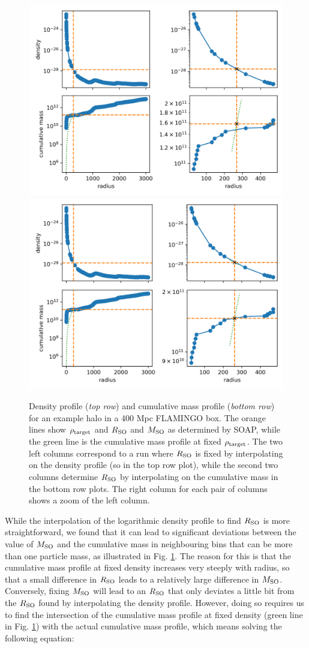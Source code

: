 \documentclass{article}
\begin{document}
\begin{figure}
    \centering
    \includegraphics[width=0.48\textwidth{}]{image7.png}
    \includegraphics[width=0.48\textwidth{}]{image4.png}
    \caption{Density profile (\emph{top row}) and cumulative mass profile (\emph{bottom row}) for an example 
    halo in a 400 Mpc FLAMINGO box. The orange lines show $\rho{}_{\rm{}target}$ and $R_{\rm{}SO}$ and 
    $M_{\rm{}SO}$ as determined by SOAP, while the green line is the cumulative mass profile at fixed 
    $\rho{}_{\rm{}target}$. The two left columns correspond to a run where $R_{\rm{}SO}$ is fixed by 
    interpolating on the density profile (so in the top row plot), while the second two columns determine 
    $R_{\rm{}SO}$ by interpolating on the cumulative mass in the bottom row plots. The right column for each 
    pair of columns shows a zoom of the left column.}
    \label{fig:MSO_vs_RSO}
\end{figure}

While the interpolation of the logarithmic density profile to find $R_{\rm{}SO}$ is more straightforward, we 
found that it can lead to significant deviations between the value of $M_{\rm{}SO}$ and the cumulative mass in 
neighbouring bins that can be more than one particle mass, as illustrated in Fig. \ref{fig:MSO_vs_RSO}. The 
reason for this is that the cumulative mass profile at fixed density increases very steeply with radius, so 
that a small difference in $R_{\rm{}SO}$ leads to a relatively large difference in $M_{\rm{}SO}$. Conversely, 
fixing $M_{\rm{}SO}$ will lead to an $R_{\rm{}SO}$ that only deviates a little bit from the $R_{\rm{}SO}$ 
found by interpolating the density profile. However, doing so requires us to find the intersection of the 
cumulative mass profile at fixed density (green line in Fig. \ref{fig:MSO_vs_RSO}) with the actual cumulative 
mass profile, which means solving the following equation:
\end{document}
